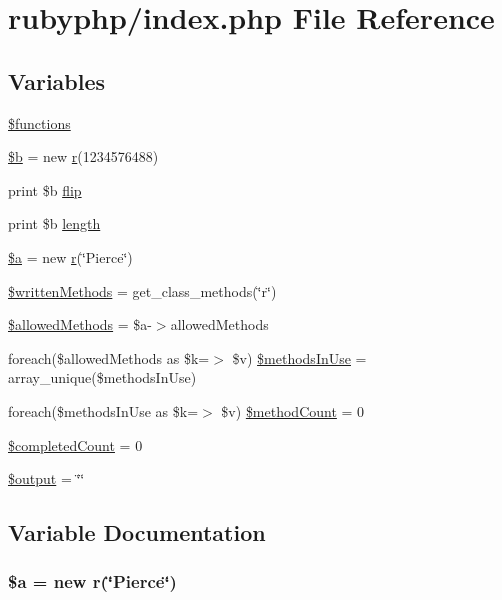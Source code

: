 \hypertarget{index_8php}{\section{rubyphp/index.php File Reference}
\label{index_8php}
}
\subsection*{Variables}
\begin{DoxyCompactItemize}
\item 
\hyperlink{index_8php_aa75daea491817f3b64daa2f51128bcdf}{\$functions}
\item 
\hyperlink{index_8php_ab9eb087b791749ae45deabb0899b7ccc}{\$b} = new \hyperlink{classr}{r}(1234576488)
\item 
print \$b \hyperlink{index_8php_a976e7b3d05fce3934ce5bc7a635bcade}{flip}
\item 
print \$b \hyperlink{index_8php_a328bd7d697cc1b3dfd1859d35420f2d0}{length}
\item 
\hyperlink{index_8php_acebf83966ef6d7e5645a6b62ba368f9f}{\$a} = new \hyperlink{classr}{r}(\char`\"{}Pierce\char`\"{})
\item 
\hyperlink{index_8php_a2e64f0494f7eccf90168af7f67198650}{\$written\-Methods} = get\-\_\-class\-\_\-methods(\char`\"{}r\char`\"{})
\item 
\hyperlink{index_8php_ab278eba7cab5341dacdccecd7a2cc2df}{\$allowed\-Methods} = \$a-\/$>$allowed\-Methods
\item 
foreach(\$allowed\-Methods as \$k=$>$ \$v) \hyperlink{index_8php_a1c475c0c53206fb15c4c3028bb7d5c7c}{\$methods\-In\-Use} = array\-\_\-unique(\$methods\-In\-Use)
\item 
foreach(\$methods\-In\-Use as \$k=$>$ \$v) \hyperlink{index_8php_a56c1b7384519355df73a254a12f0bae3}{\$method\-Count} = 0
\item 
\hyperlink{index_8php_a51c734a41c7747051953ec3d78dd1c5b}{\$completed\-Count} = 0
\item 
\hyperlink{index_8php_a3b3e916294d02621688f0b1b64f95628}{\$output} = \char`\"{}\char`\"{}
\end{DoxyCompactItemize}


\subsection{Variable Documentation}
\hypertarget{index_8php_acebf83966ef6d7e5645a6b62ba368f9f}{
\subsubsection[{\$a}]{\setlength{\rightskip}{0pt plus 5cm}\$a = new {\bf r}(\char`\"{}Pierce\char`\"{})}}\label{index_8php_acebf83966ef6d7e5645a6b62ba368f9f}


